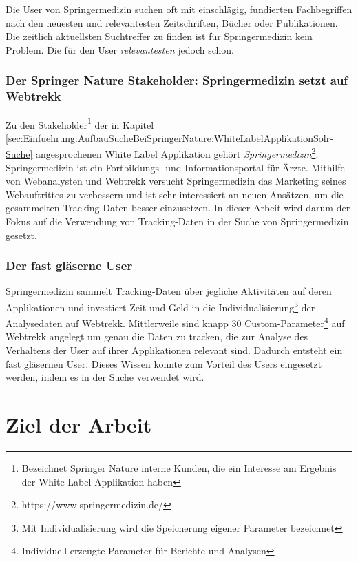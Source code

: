 Die User von Springermedizin suchen oft mit einschlägig, fundierten Fachbegriffen nach den neuesten und relevantesten Zeitschriften, Bücher oder Publikationen. Die zeitlich aktuellsten Suchtreffer zu finden ist für Springermedizin kein Problem. Die für den User \textit{relevantesten} jedoch schon.

\subsubsection{Der Springer Nature Stakeholder: Springermedizin setzt auf Webtrekk}
\label{sec:Einfuehrung:Problemstellung:Springermedizin}

Zu den Stakeholder\footnote{Bezeichnet Springer Nature interne Kunden, die ein Interesse am Ergebnis der White Label Applikation haben} der in Kapitel \ref{sec:Einfuehrung:AufbauSucheBeiSpringerNature:WhiteLabelApplikationSolr-Suche} angesprochenen White Label Applikation gehört \textit{Springermedizin}\footnote{https://www.springermedizin.de/}. Springermedizin ist ein Fortbildungs- und Informationsportal für Ärzte. Mithilfe von Webanalysten und Webtrekk versucht Springermedizin das Marketing seines Webauftrittes zu verbessern und ist sehr interessiert an neuen Ansätzen, um die gesammelten Tracking-Daten besser einzusetzen. In dieser Arbeit wird darum der Fokus auf die Verwendung von Tracking-Daten in der Suche von Springermedizin gesetzt. 
 

\subsubsection{Der fast gläserne User}
\label{sec:Einfuehrung:Problemstellung:Glaeserne-User}

Springermedizin sammelt Tracking-Daten über jegliche Aktivitäten auf deren Applikationen und investiert Zeit und Geld in die Individualisierung\footnote{Mit Individualisierung wird die Speicherung eigener Parameter bezeichnet} der Analysedaten auf Webtrekk. Mittlerweile sind knapp 30 Custom-Parameter\footnote{Individuell erzeugte Parameter für Berichte und Analysen} auf Webtrekk angelegt um genau die Daten zu tracken, die zur Analyse des Verhaltens der User auf ihrer Applikationen relevant sind. Dadurch entsteht ein fast \glqq gläsernen User\grqq{}. Dieses Wissen könnte zum Vorteil des Users eingesetzt werden, indem es in der Suche verwendet wird.

\section{Ziel der Arbeit}
\label{sec:Einfuehrung:ZielArbeit}

